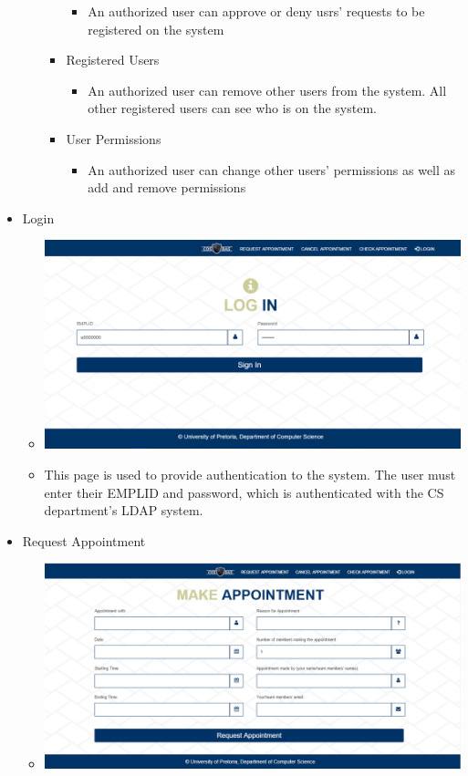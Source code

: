 \begin{itemize}
\begin{itemize}
\begin{itemize}
						\begin{itemize}
							\item An authorized user can approve or deny usrs' requests to be registered on the system
						\end{itemize}
					\item Registered Users
						\begin{itemize}
							\item An authorized user can remove other users from the system. All other registered users can see who is on the system. 
						\end{itemize}
					\item User Permissions
						\begin{itemize}
							\item An authorized user can change other users' permissions as well as add and remove permissions
						\end{itemize}
				\end{itemize}
			\end{itemize}
		\item Login
			\begin{itemize}
				\item \includegraphics[width=\linewidth]{images/Screenshots/Login.png}
				\item This page is used to provide authentication to the system. The user must enter their EMPLID and password, which is authenticated with the CS department's LDAP system.
			\end{itemize}
		\item Request Appointment
			\begin{itemize}
				\item \includegraphics[width=\linewidth]{images/Screenshots/RequestAppoint.png}

\end{itemize}
\end{itemize}
